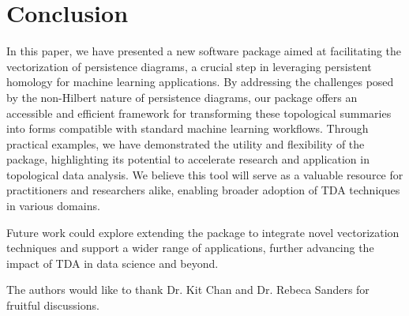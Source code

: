 \documentclass[conference, onecolumn]{IEEEtran}
\begin{document}
\section{Conclusion}

In this paper, we have presented a new software package aimed at facilitating the vectorization of persistence diagrams, a crucial step in leveraging persistent homology for machine learning applications. By addressing the challenges posed by the non-Hilbert nature of persistence diagrams, our package offers an accessible and efficient framework for transforming these topological summaries into forms compatible with standard machine learning workflows. Through practical examples, we have demonstrated the utility and flexibility of the package, highlighting its potential to accelerate research and application in topological data analysis. We believe this tool will serve as a valuable resource for practitioners and researchers alike, enabling broader adoption of TDA techniques in various domains.

Future work could explore extending the package to integrate novel vectorization techniques and support a wider range of applications, further advancing the impact of TDA in data science and beyond.

The authors would like to thank Dr. Kit Chan and Dr. Rebeca Sanders for fruitful discussions.





\renewcommand{\etalchar}[1]{$^{#1}$}




\end{document}
